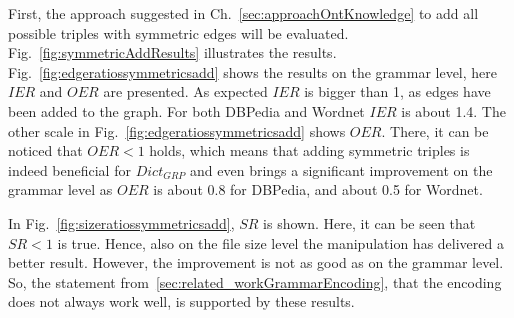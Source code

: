 First, the approach suggested in Ch.~\ref{sec:approachOntKnowledge} to add all possible triples with symmetric edges will be evaluated. Fig.~\ref{fig:symmetricAddResults} illustrates the results. Fig.~\ref{fig:edgeratiossymmetricsadd} shows the results on the grammar level, here $IER$ and $OER$ are presented. As expected $IER$ is bigger than 1, as edges have been added to the graph. For both DBPedia and Wordnet $IER$ is about 1.4. The other scale in Fig.~\ref{fig:edgeratiossymmetricsadd} shows $OER$. There, it can be noticed that $OER<1$ holds, which means that adding symmetric triples is indeed beneficial for $Dict_{GRP}$ and even brings a significant improvement on the grammar level as $OER$ is about 0.8 for DBPedia, and about 0.5 for Wordnet.

In Fig.~\ref{fig:sizeratiossymmetricsadd}, $SR$ is shown. Here, it can be seen that $SR<1$ is true. Hence, also on the file size level the manipulation has delivered a better result. However, the improvement is not as good as on the grammar level. So, the statement from~\ref{sec:related_workGrammarEncoding}, that the encoding does not always work well, is supported by these results. 

